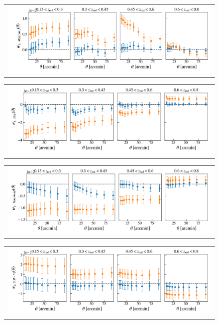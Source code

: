 \documentclass[fleqn,usenatbib,useAMS]{mnras}
\begin{document}
\begin{figure}
\begin{tabular}{c}
\includegraphics[width=\textwidth]{figures_tmp/sys/wcross_sys_type_ulim.png}
\end{tabular}
\begin{tabular}{c}
\includegraphics[width=\textwidth]{figures_tmp/sys/wcross_sys_type_BackGr.png}
\end{tabular}
\caption{\label{fig:xcorr_ulim_bkg}} 
\end{figure}

\begin{figure}
\begin{tabular}{c}
\includegraphics[width=\textwidth]{figures_tmp/sys/wcross_sys_type_threshold.png}
\end{tabular}
\begin{tabular}{c}
\includegraphics[width=\textwidth]{figures_tmp/sys/wcross_sys_type_extinction.png}
\end{tabular}
\caption{\label{fig:xcorr_threshold_ext}} 
\end{figure}
\end{document}
